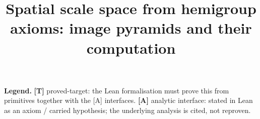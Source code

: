 \documentclass[11pt]{report}
\title{Spatial scale space from hemigroup axioms: image pyramids and their computation}
\author{}
\date{}
\begin{document}
\maketitle

\noindent\textbf{Legend.}\quad
\textbf{[T]} \textsf{proved-target}: the Lean formalisation must prove this from primitives together with
the [A] interfaces.\quad
\textbf{[A]} \textsf{analytic interface}: stated in Lean as an axiom / carried hypothesis; the underlying
analysis is cited, not reproven.

\tableofcontents


\end{document}

